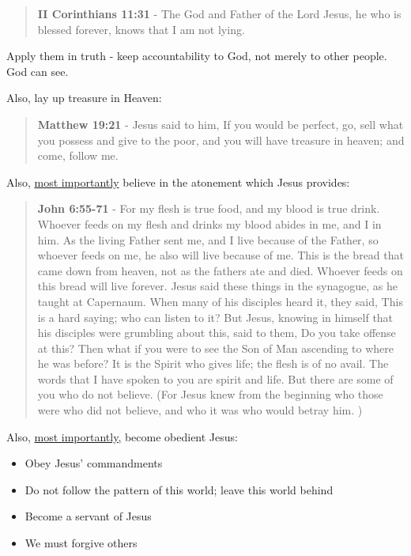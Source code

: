 \documentclass[11pt]{article}
\begin{document}
\begin{quote}
\textbf{II Corinthians 11:31} - The God and Father of the Lord Jesus, he who is blessed forever, knows that I am not lying.
\end{quote}

Apply them in truth - keep accountability to God, not merely to other people. God can see.

Also, lay up treasure in Heaven:

\begin{quote}
\textbf{Matthew 19:21} - Jesus said to him, If you would be perfect, go, sell what you possess and give to the poor, and you will have treasure in heaven; and come, follow me.
\end{quote}

Also, \uline{most importantly} believe in the atonement which Jesus provides:

\begin{quote}
\textbf{John 6:55-71} - For my flesh is true food, and my blood is true drink. Whoever feeds on my flesh and drinks my blood abides in me, and I in him. As the living Father sent me, and I live because of the Father, so whoever feeds on me, he also will live because of me. This is the bread that came down from heaven, not as the fathers ate and died. Whoever feeds on this bread will live forever. Jesus said these things in the synagogue, as he taught at Capernaum. When many of his disciples heard it, they said, This is a hard saying; who can listen to it? But Jesus, knowing in himself that his disciples were grumbling about this, said to them, Do you take offense at this? Then what if you were to see the Son of Man ascending to where he was before? It is the Spirit who gives life; the flesh is of no avail. The words that I have spoken to you are spirit and life. But there are some of you who do not believe. (For Jesus knew from the beginning who those were who did not believe, and who it was who would betray him. )
\end{quote}

Also, \uline{most importantly,} become obedient Jesus:
\begin{itemize}
\item Obey Jesus' commandments
\item Do not follow the pattern of this world; leave this world behind
\item Become a servant of Jesus
\item We must forgive others
\end{itemize}
\end{document}
